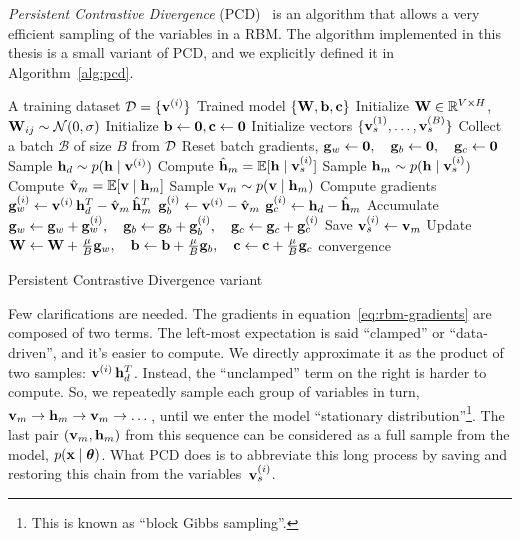 \emph{Persistent Contrastive Divergence}
(PCD)~\cite{bib:rbm-persistent-cd} is an algorithm that allows a very efficient sampling of the
variables in a RBM.  The algorithm implemented in this thesis is a small
variant of PCD, and we explicitly defined it in Algorithm~\ref{alg:pcd}.
\begin{algorithm}[thb]
	\centering
	\begin{algorithmic}[1]
		\Require A training dataset $\mathcal{D} = \{\mathbf{v}^{(i)}\}$
		\Ensure Trained model $\{\mathbf{W}, \mathbf{b}, \mathbf{c}\}$
		\State Initialize $\mathbf{W} \in \mathbb{R}^{V \times H}$,
			$\mathbf{W}_{ij} \sim \mathcal{N}(0,\sigma)$
		\State Initialize $\mathbf{b} \gets \mathbf{0}, \mathbf{c} \gets \mathbf{0}$
		\State Initialize vectors $\{\mathbf{v}_s^{(1)}, \dots, \mathbf{v}_s^{(B)}\}$
		\Repeat
			\State Collect a batch $\mathcal{B}$ of size $B$ from $\mathcal{D}$
			\State Reset batch gradients, $\mathbf{g}_w \gets \mathbf{0},
				\quad \mathbf{g}_b \gets \mathbf{0},
				\quad \mathbf{g}_c \gets \mathbf{0}$
				\State Sample $\mathbf{h}_d \sim p(\mathbf{h} \mid \mathbf{v}^{(i)})$
				\State Compute $\hat{\mathbf{h}}_m = \mathbb{E}[\mathbf{h} \mid \mathbf{v}_s^{(i)}]$
				\State Sample $\mathbf{h}_m \sim p(\mathbf{h} \mid \mathbf{v}_s^{(i)})$
				\State Compute $\hat{\mathbf{v}}_m = \mathbb{E}[\mathbf{v} \mid \mathbf{h}_m]$
				\State Sample $\mathbf{v}_m \sim p(\mathbf{v} \mid \mathbf{h}_m)$
				\State Compute gradients 
					\Statex[3] $\mathbf{g}_w^{(i)} \gets
						\mathbf{v}^{(i)}\, \mathbf{h}_d^T - \hat{\mathbf{v}}_m\, \hat{\mathbf{h}}_m^T$
					\Statex[3] $\mathbf{g}_b^{(i)} \gets \mathbf{v}^{(i)} - \hat{\mathbf{v}}_m$
					\Statex[3] $\mathbf{g}_c^{(i)} \gets \mathbf{h}_d - \hat{\mathbf{h}}_m$
				\State Accumulate $\mathbf{g}_w \gets \mathbf{g}_w + \mathbf{g}_w^{(i)},
					\quad \mathbf{g}_b \gets \mathbf{g}_b + \mathbf{g}_b^{(i)},
					\quad \mathbf{g}_c \gets \mathbf{g}_c + \mathbf{g}_c^{(i)}$
				\State Save $\mathbf{v}_s^{(i)} \gets \mathbf{v}_m$
			\EndFor
			\State Update $\mathbf{W} \gets \mathbf{W} + \frac{\mu}{B} \mathbf{g}_w,
				\quad \mathbf{b} \gets \mathbf{b} + \frac{\mu}{B} \mathbf{g}_b,
				\quad \mathbf{c} \gets \mathbf{c} + \frac{\mu}{B} \mathbf{g}_c$
		\Until convergence
	\end{algorithmic}
	\caption{Persistent Contrastive Divergence variant}
	\label{alg:pcd}
\end{algorithm}

Few clarifications are needed. The gradients in
equation~\ref{eq:rbm-gradients} are composed of two terms. The left-most
expectation is said ``clamped'' or ``data-driven'', and it's easier to
compute. We directly approximate it as the product of two samples:
$\mathbf{v}^{(i)}\, \mathbf{h}_d^T$. Instead, the ``unclamped'' term on the right is
harder to compute. So, we repeatedly sample each group of variables in turn,
$\mathbf{v}_m \to \mathbf{h}_m \to \mathbf{v}_m \to \dots$, until we enter the model ``stationary
distribution''\footnote{This is known as ``block Gibbs sampling''.}. The last
pair $(\mathbf{v}_m, \mathbf{h}_m)$ from this sequence can be considered as a full sample
from the model, $p(\mathbf{x} \mid \bm{\theta})$. What PCD does is to abbreviate this
long process by saving and restoring this chain from the
variables~$\mathbf{v}_s^{(i)}$.

